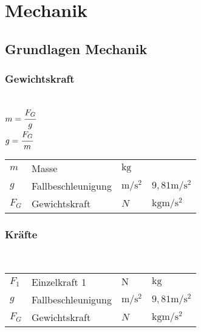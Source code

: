 \documentclass[a4paper, 10pt]{article}
\begin{document}
\section{Mechanik}

\subsection{Grundlagen Mechanik}

\subsubsection{Gewichtskraft}
\begin{minipage}{0.45\textwidth}

 \\
$m = \cfrac{F_G}{g}$ \\
$g = \cfrac{F_G}{m}$

\end{minipage}
\begin{minipage}{0.45\textwidth}

\begin{tabular}{llll}
$m$ & Masse & $\si{\kilo\gram}$ & \\
$g$ & Fallbeschleunigung & $\si{\metre\per\square\second}$ & $9,81 \si{\metre\per\square\second}$ \\
$F_G$ & Gewichtskraft & $N$ & $\si{\kilogram\metre\per\square\second}$ \\
\end{tabular}

\end{minipage}

\subsubsection{Kräfte}
\begin{minipage}{0.45\textwidth}

 \\

\end{minipage}
\begin{minipage}{0.45\textwidth}

\begin{tabular}{llll}
$F_1$ & Einzelkraft 1 & $\si{\newton}$ & $\si{\kilo\gram}$ \\
$g$ & Fallbeschleunigung & $\si{\metre\per\square\second}$ & $9,81 \si{\metre\per\square\second}$ \\
$F_G$ & Gewichtskraft & $N$ & $\si{\kilogram\metre\per\square\second}$ \\
\end{tabular}

\end{minipage}
\end{document}
